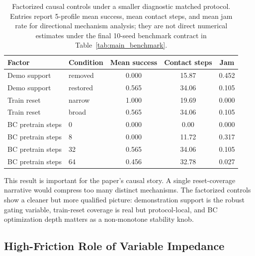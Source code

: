 ﻿\documentclass[11pt]{article}
\begin{document}
\begin{table}[t]
  \centering
  \small
  \caption{Factorized causal controls under a smaller diagnostic matched protocol. Entries report
  5-profile mean success, mean contact steps, and mean jam rate for directional mechanism
  analysis; they are not direct numerical estimates under the final 10-seed benchmark contract
  in Table~\ref{tab:main_benchmark}.}
  \label{tab:mechanism_matrix}
  \begin{tabular}{llccc}
    \toprule
    Factor & Condition & Mean success & Contact steps & Jam \\
    \midrule
    Demo support & removed & 0.000 & 15.87 & 0.452 \\
    Demo support & restored & 0.565 & 34.06 & 0.105 \\
    Train reset & narrow & 1.000 & 19.69 & 0.000 \\
    Train reset & broad & 0.565 & 34.06 & 0.105 \\
    BC pretrain steps & 0 & 0.000 & 0.00 & 0.000 \\
    BC pretrain steps & 8 & 0.000 & 11.72 & 0.317 \\
    BC pretrain steps & 32 & 0.565 & 34.06 & 0.105 \\
    BC pretrain steps & 64 & 0.456 & 32.78 & 0.027 \\
    \bottomrule
  \end{tabular}
\end{table}

This result is important for the paper's causal story. A single reset-coverage narrative would
compress too many distinct mechanisms. The factorized controls show a cleaner but more qualified
picture: demonstration support is the robust gating variable, train-reset coverage is real but
protocol-local, and BC optimization depth matters as a non-monotone stability knob.

\subsection{High-Friction Role of Variable Impedance}
\label{sec:physical-value}
\end{document}
